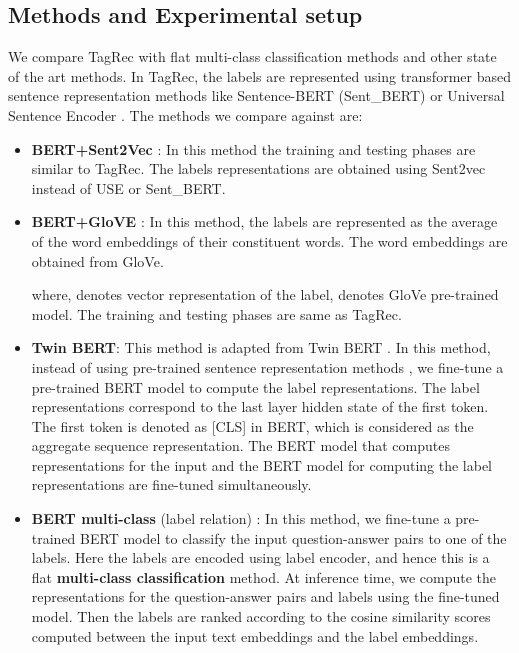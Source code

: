 \documentclass[runningheads, envcountsame, a4paper]{llncs}
\begin{document}
\subsection{Methods and Experimental setup}
 We compare TagRec with flat multi-class classification methods and other state of the art methods. In TagRec, the labels are represented using transformer based sentence representation methods like Sentence-BERT (Sent\_BERT) \cite{reimers-gurevych-2019-sentence} or Universal Sentence Encoder \cite{cer-etal-2018-universal}.
The methods we compare against are:
\let\labelitemi\labelitemii
\begin{itemize}
  \setlength\itemsep{0.5em}

    \item \textbf{BERT+Sent2Vec} : In this method the training and testing phases are similar to TagRec. The labels representations are obtained using Sent2vec \cite{pagliardini2017unsupervised} instead of USE or Sent\_BERT.
    \item \textbf{BERT+GloVE} : In this method, the labels are represented as the average of the word embeddings of their constituent words. The word embeddings are obtained from GloVe.
    \setlength{\parindent}{0pt}
    
    where,  denotes vector representation of the label,  denotes GloVe pre-trained model. The training and testing phases are same as TagRec.

    \item \textbf{Twin BERT}:  This method is adapted from Twin BERT \cite{twinbert}. In this method, instead of using pre-trained sentence representation methods , we fine-tune a pre-trained BERT model to compute the label representations. The label representations correspond to the last layer hidden state of the first token. The first token is denoted as [CLS] in BERT, which is considered as the aggregate sequence representation. The BERT model that computes representations for the input and the BERT model for computing the label representations are fine-tuned simultaneously. 


    \item \textbf{BERT multi-class}  (label relation)  \cite{xumulti}: In this method, we fine-tune a pre-trained BERT model to classify the input question-answer pairs to one of the labels. Here the labels are encoded using label encoder, and hence this is a flat \textbf{multi-class classification} method. At inference time, we compute the representations for the question-answer pairs and labels using the fine-tuned model. Then the labels are ranked according to the cosine similarity scores computed between the input text embeddings and the label embeddings. 
           


\end{itemize}
\end{document}
